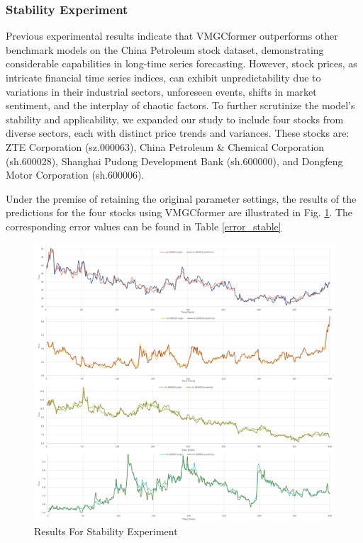\documentclass[sn-mathphys,Numbered]{sn-jnl}
\theoremstyle{thmstyleone}%
\theoremstyle{thmstyletwo}%
\theoremstyle{thmstylethree}%
\begin{document}
\subsubsection{Stability Experiment}\label{subsubsec3}
Previous experimental results indicate that VMGCformer outperforms other benchmark models on the China Petroleum stock dataset, demonstrating considerable capabilities in long-time series forecasting. However, stock prices, as intricate financial time series indices, can exhibit unpredictability due to variations in their industrial sectors, unforeseen events, shifts in market sentiment, and the interplay of chaotic factors. To further scrutinize the model's stability and applicability, we expanded our study to include four stocks from diverse sectors, each with distinct price trends and variances. These stocks are: ZTE Corporation (sz.000063), China Petroleum \& Chemical Corporation (sh.600028), Shanghai Pudong Development Bank (sh.600000), and Dongfeng Motor Corporation (sh.600006).

Under the premise of retaining the original parameter settings, the results of the predictions for the four stocks using VMGCformer are illustrated in Fig. \ref{stable}. The corresponding error values can be found in Table \ref{error_stable}

\begin{figure}[h]
    \centering
    \includegraphics[width=1\textwidth]{pngs/stable.png}
    \caption{ Results For Stability Experiment}
    \label{stable}
\end{figure}
\end{document}

